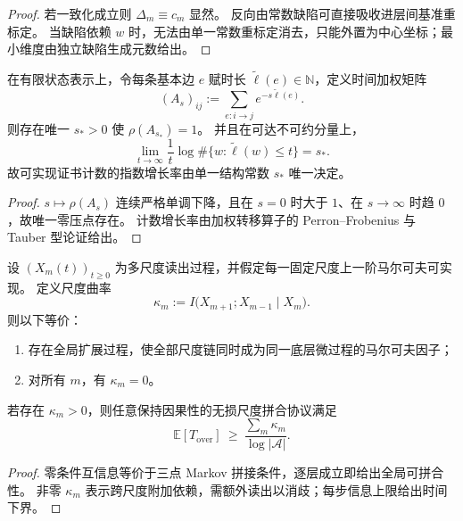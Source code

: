 \begin{proof}
若一致化成立则 \(\Delta_m\equiv c_m\) 显然。
反向由常数缺陷可直接吸收进层间基准重标定。
当缺陷依赖 \(w\) 时，无法由单一常数重标定消去，只能外置为中心坐标；最小维度由独立缺陷生成元数给出。
\end{proof}

\begin{theorem}\label{thm:xi-time-weighted-spectral-radius-growth-law}
在有限状态表示上，令每条基本边 \(e\) 赋时长 \(\widetilde\ell(e)\in\mathbb N\)，定义时间加权矩阵
\[
(A_s)_{ij}:=\sum_{e:i\to j}e^{-s\widetilde\ell(e)}.
\]
则存在唯一 \(s_\ast>0\) 使 \(\rho(A_{s_\ast})=1\)。
并且在可达不可约分量上，
\[
\lim_{t\to\infty}\frac1t\log \#\{w:\widetilde\ell(w)\le t\}=s_\ast.
\]
故可实现证书计数的指数增长率由单一结构常数 \(s_\ast\) 唯一决定。
\end{theorem}

\begin{proof}
\(s\mapsto \rho(A_s)\) 连续严格单调下降，且在 \(s=0\) 时大于 \(1\)、在 \(s\to\infty\) 时趋 \(0\)，故唯一零压点存在。
计数增长率由加权转移算子的 Perron--Frobenius 与 Tauber 型论证给出。
\end{proof}

\begin{theorem}\label{thm:xi-multiscale-cmi-as-time-curvature}
设 \((X_m(t))_{t\ge 0}\) 为多尺度读出过程，并假定每一固定尺度上一阶马尔可夫可实现。
定义尺度曲率
\[
\kappa_m:=I\!\bigl(X_{m+1};X_{m-1}\mid X_m\bigr).
\]
则以下等价：
\begin{enumerate}
  \item 存在全局扩展过程，使全部尺度链同时成为同一底层微过程的马尔可夫因子；
  \item 对所有 \(m\)，有 \(\kappa_m=0\)。
\end{enumerate}
若存在 \(\kappa_m>0\)，则任意保持因果性的无损尺度拼合协议满足
\[
\mathbb E[T_{\mathrm{over}}]\ \ge\ \frac{\sum_m \kappa_m}{\log|\mathcal A|}.
\]
\end{theorem}

\begin{proof}
零条件互信息等价于三点 Markov 拼接条件，逐层成立即给出全局可拼合性。
非零 \(\kappa_m\) 表示跨尺度附加依赖，需额外读出以消歧；每步信息上限给出时间下界。
\end{proof}

